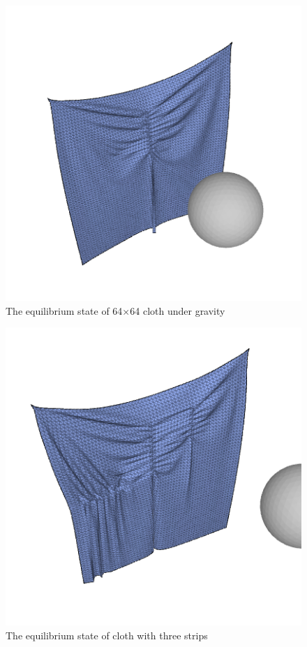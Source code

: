 \documentclass[a4paper,10pt]{article}
\begin{document}
\begin{figure}
 \centering
 \includegraphics[scale=0.45]{img/final.png}
 \caption{The equilibrium state of 64$\times$64 cloth under gravity}
 \label{fig:final}
\end{figure}

\begin{figure}
 \centering
 \includegraphics[scale=0.42]{img/multiple_strip.png}
 \caption{The equilibrium state of cloth with three strips}
 \label{fig:multiple}
\end{figure}
\end{document}
